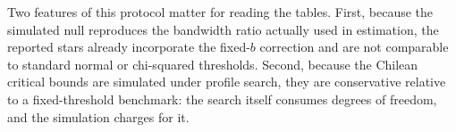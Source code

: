 Two features of this protocol matter for reading the tables. First,
because the simulated null reproduces the bandwidth ratio actually used
in estimation, the reported stars already incorporate the fixed-$b$
correction and are not comparable to standard normal or chi-squared
thresholds. Second, because the Chilean critical bounds are simulated
under profile search, they are conservative relative to a fixed-threshold
benchmark: the search itself consumes degrees of freedom, and the
simulation charges for it.
